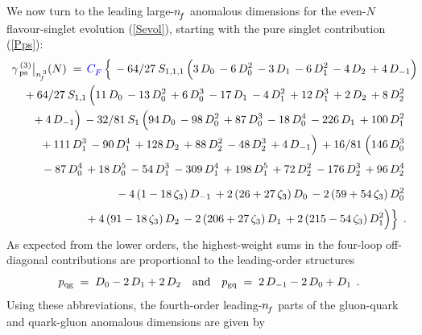 \documentclass[12pt]{article}
\newcommand{\colourcolour}[1]{{\color{blue}{#1}}}
\newcommand{\beq}{\begin{equation}}
\newcommand{\eeq}{\end{equation}}
\newcommand{\bea}{\begin{eqnarray}}
\newcommand{\eea}{\end{eqnarray}}
\newcommand{\nn}{\nonumber}
\newcommand{\gqqps}[1]{\gamma_{\,\rm ps}^{\,(#1)}}
\begin{document}
We now turn to the leading large-${n^{}_{\! f}}$ anomalous dimensions for the even-$N$
flavour-singlet evolution (\ref{Sevol}), starting with the pure singlet
contribution (\ref{Pps}):
%
\bea
\label{gpsnf3}
\lefteqn{\gqqps{3}\big|_{\nft}(N) \;=\,
          \colourcolour{\cf} \, \*  \Big\{\,
          - 64/27\: \* \Sss(1,1,1)\, \* \Big(3\, \* D_{0}\,
              - 6\, \* D_{0}^{2}\,
              - 3\, \* D_{1}\,
              - 6\, \* D_{1}^{2}\,
              - 4\, \* D_{2}\,
              + 4\, \* D_{-1}\Big)\,
}
   \nn \\[0mm] & & \mbox{} \vphantom{\Big(}
          + 64/27\: \* \Ss(1,1)\, \* \Big(11\, \* D_{0}\,
              - 13\, \* D_{0}^{2}\,
              + 6\, \* D_{0}^{3}\,
              - 17\, \* D_{1}\,
              - 4\, \* D_{1}^{2}\,
              + 12\, \* D_{1}^{3}\,
              + 2\, \* D_{2}\,
              + 8\, \* D_{2}^{2}\,
   \nn \\[0mm] & & \mbox{} \vphantom{\Big(}
              + 4\, \* D_{-1}\Big)\,
          - 32/81\: \* \S(1)\, \* \Big(94\, \* D_{0}\,
              - 98\, \* D_{0}^{2}\,
              + 87\, \* D_{0}^{3}\,
              - 18\, \* D_{0}^{4}\,
              - 226\, \* D_{1}\,
              + 100\, \* D_{1}^{2}\,
   \nn \\[0mm] & & \mbox{} \vphantom{\Big(}
              + 111\, \* D_{1}^{3}\,
              - 90\, \* D_{1}^{4}\,
              + 128\, \* D_{2}\,
              + 88\, \* D_{2}^{2}\,
              - 48\, \* D_{2}^{3}\,
              + 4\, \* D_{-1}\Big)\,
          + 16/81\: \* \Big(146\, \* D_{0}^{3}\,
   \nn \\[0mm] & & \mbox{} \vphantom{\Big(}
              - 87\, \* D_{0}^{4}\,
              + 18\, \* D_{0}^{5}\,
              - 54\, \* D_{1}^{3}\,
              - 309\, \* D_{1}^{4}\,
              + 198\, \* D_{1}^{5}\,
              + 72\, \* D_{2}^{2}\,
              - 176\, \* D_{2}^{3}\,
              + 96\, \* D_{2}^{4}\,
   \nn \\[0mm] & & \mbox{} \vphantom{\Big(}
              - 4\, \* (1 - 18\, \* \z3)\, \* D_{-1}\,
              + 2\, \* (26 + 27\, \* \z3)\, \* D_{0}\,
              - 2\, \* (59 + 54\, \* \z3)\, \* D_{0}^{2}\,
   \nn \\[0mm] & & \mbox{} \vphantom{\Big(}
              + 4\, \* (91 - 18\, \* \z3)\, \* D_{2}\,
              - 2\, \* (206 + 27\, \* \z3)\, \* D_{1}\,
              + 2\, \* (215 - 54\, \* \z3)\, \* D_{1}^{2}\Big)
          \Big\}
\:\: .
\eea
%
As expected from the lower orders, the highest-weight sums in the four-loop
off-diagonal contributions are proportional to the leading-order structures
%
\beq
\label{pqgpgq}
  p_{\rm qg} \;=\; D_0 - 2\*\, D_1 + 2\*\, D_2 
\quad \mbox{and} \quad
  p_{\rm gq} \;=\; 2\*\, D_{-1} - 2\*\, D_0 + D_1
\:\: .
\eeq
%
Using these abbreviations, the fourth-order leading-${n^{}_{\! f}}$ parts 
of the gluon-quark and quark-gluon anomalous dimensions are given by
 
\end{document}
